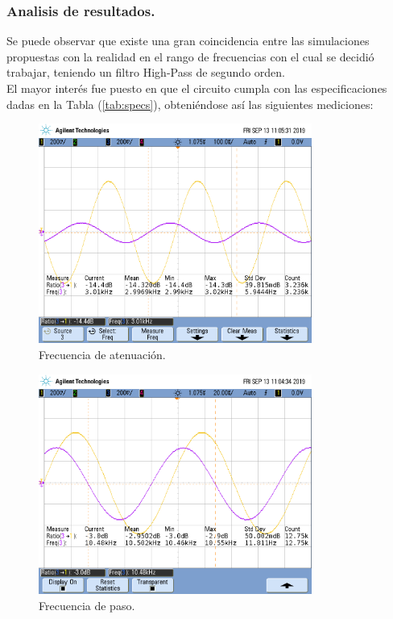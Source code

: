 \subsubsection{Analisis de resultados.} 
Se puede observar que existe una gran coincidencia entre las simulaciones propuestas con la realidad en el rango de frecuencias con el cual se decidió trabajar, teniendo un filtro High-Pass de segundo orden.\\
El mayor interés fue puesto en que el circuito cumpla con las especificaciones dadas en la Tabla (\ref{tab:specs}), obteniéndose así las siguientes mediciones:

\begin{figure}[H]	
	\centering
	\includegraphics[width=0.8\textwidth, trim = {0 3.35cm 0 2cm},clip]{ImagenesEj2/MedicionesGrilla/fa_hp.png}
	\caption{Frecuencia de atenuación.}
	\label{fig:fahp}
\end{figure}
\begin{figure}[H]	
	\centering
	\includegraphics[width=0.8\textwidth, trim = {0 3.35cm 0 2cm},clip]{ImagenesEj2/MedicionesGrilla/fp_hp.png}
	\caption{Frecuencia de paso.}
	\label{fig:fphp}
\end{figure}

